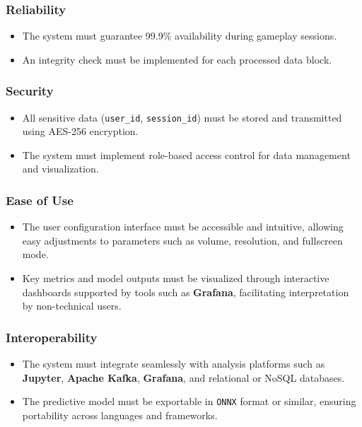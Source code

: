 \documentclass{article}
\newcommand{\reqnumNF}[1]{\textbf{\underline{RNF-#1}}}
\begin{document}
\subsubsection{Reliability}
\begin{itemize}
    \item[\reqnumNF{003}] The system must guarantee 99.9\% availability during gameplay sessions.
    \item[\reqnumNF{004}] An integrity check must be implemented for each processed data block.
\end{itemize}

\subsubsection{Security}
\begin{itemize}
    \item[\reqnumNF{005}] All sensitive data (\texttt{user\_id}, \texttt{session\_id}) must be stored and transmitted using AES-256 encryption.
    \item[\reqnumNF{006}] The system must implement role-based access control for data management and visualization.
\end{itemize}

\subsubsection{Ease of Use}
\begin{itemize}
    \item[\reqnumNF{007}] The user configuration interface must be accessible and intuitive, allowing easy adjustments to parameters such as volume, resolution, and fullscreen mode.
    \item[\reqnumNF{008}] Key metrics and model outputs must be visualized through interactive dashboards supported by tools such as \textbf{Grafana}, facilitating interpretation by non-technical users.
\end{itemize}

\subsubsection{Interoperability}
\begin{itemize}
    \item[\reqnumNF{009}] The system must integrate seamlessly with analysis platforms such as \textbf{Jupyter}, \textbf{Apache Kafka}, \textbf{Grafana}, and relational or NoSQL databases.
    \item[\reqnumNF{010}] The predictive model must be exportable in \texttt{ONNX} format or similar, ensuring portability across languages and frameworks.
\end{itemize}
    
\end{document}
